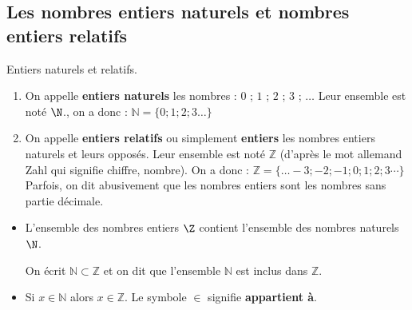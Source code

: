 \begin{pageCours}


\section{Les nombres entiers naturels et nombres entiers relatifs}

\begin{DefT}{Entiers naturels et relatifs.}

\begin{enumerate}
\item On appelle \textbf{entiers naturels} les nombres : $0$ ; $1$ ; $2$ ; $3$ ; $\ldots$  Leur ensemble est noté $\N$., on a donc : $\mathbb N=  \lbrace 0 ; 1 ; 2 ; 3 \ldots \rbrace $
 
\item  On appelle \textbf{entiers relatifs} ou simplement \textbf{entiers} les nombres entiers naturels et leurs opposés. Leur ensemble est noté $\mathbb Z$ (d'après le mot allemand Zahl qui signifie chiffre, nombre).
On a donc : $\mathbb Z = \lbrace \ldots -3 ; -2 ; -1 ; 0 ; 1 ; 2 ; 3  \cdots  \rbrace$
Parfois, on dit abusivement que les nombres entiers sont les nombres sans partie décimale.
\end{enumerate}
\end{DefT}

\begin{minipage}{0.6\linewidth}
\begin{Rqs} 
\begin{itemize}[leftmargin=*]
\item L'ensemble des nombres entiers $\Z$ contient l'ensemble des nombres naturels $\N$. 

On écrit $\mathbb N  \subset \mathbb Z$ et on dit que l'ensemble $\mathbb N$ est inclus dans $\mathbb Z$.

\item Si $x \in \mathbb N$ alors $x \in \mathbb Z$. Le symbole $\in$ signifie \textbf{appartient à}. 
\end{itemize}
\end{Rqs}
 
\end{minipage}
\begin{minipage}{0.4\linewidth} 
 

\end{minipage}
\end{pageCours}
